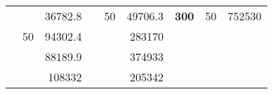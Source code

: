 \begin{table}[]
\begin{tabular}{|ccrccrccc}
\rowcolor[HTML]{DDFDFF} 
\multicolumn{1}{|c|}{\cellcolor[HTML]{FFFFC7}}                                & \multicolumn{1}{c|}{\cellcolor[HTML]{DDFDFF}}                      & \multicolumn{1}{r|}{\cellcolor[HTML]{DAE8FC}36782.8}   & \multicolumn{1}{c|}{\cellcolor[HTML]{FFFFC7}}                                & \multicolumn{1}{c|}{\multirow{-10}{*}{\cellcolor[HTML]{DDFDFF}50}}  & \multicolumn{1}{r|}{\cellcolor[HTML]{DDFDFF}49706.3}   & \multicolumn{1}{c|}{\multirow{-19}{*}{\cellcolor[HTML]{FFFFC7}\textbf{300}}} & \multicolumn{1}{c|}{\multirow{-10}{*}{\cellcolor[HTML]{DDFDFF}50}} & \multicolumn{1}{r|}{\cellcolor[HTML]{DDFDFF}752530}    \\ \cline{3-3} \cline{5-9} 
\multicolumn{1}{|c|}{\cellcolor[HTML]{FFFFC7}}                                & \multicolumn{1}{c|}{\multirow{-10}{*}{\cellcolor[HTML]{DDFDFF}50}} & \multicolumn{1}{r|}{\cellcolor[HTML]{DDFDFF}94302.4}   & \multicolumn{1}{c|}{\cellcolor[HTML]{FFFFC7}}                                & \multicolumn{1}{c|}{\cellcolor[HTML]{DAE8FC}}                       & \multicolumn{1}{r|}{\cellcolor[HTML]{DAE8FC}283170}    &                                                                              &                                                                    &                                                        \\ \cline{2-3} \cline{6-6}
\multicolumn{1}{|c|}{\cellcolor[HTML]{FFFFC7}}                                & \multicolumn{1}{c|}{\cellcolor[HTML]{DAE8FC}}                      & \multicolumn{1}{r|}{\cellcolor[HTML]{DAE8FC}88189.9}   & \multicolumn{1}{c|}{\cellcolor[HTML]{FFFFC7}}                                & \multicolumn{1}{c|}{\cellcolor[HTML]{DAE8FC}}                       & \multicolumn{1}{r|}{\cellcolor[HTML]{DDFDFF}374933}    &                                                                              &                                                                    &                                                        \\ \cline{3-3} \cline{6-6}
\multicolumn{1}{|c|}{\cellcolor[HTML]{FFFFC7}}                                & \multicolumn{1}{c|}{\cellcolor[HTML]{DAE8FC}}                      & \multicolumn{1}{r|}{\cellcolor[HTML]{DDFDFF}108332}    & \multicolumn{1}{c|}{\cellcolor[HTML]{FFFFC7}}                                & \multicolumn{1}{c|}{\cellcolor[HTML]{DAE8FC}}                       & \multicolumn{1}{r|}{\cellcolor[HTML]{DAE8FC}205342}    &                                                                              &                                                                    &                                                        \\ \cline{3-3} \cline{6-6}

\end{tabular}
\end{table}

